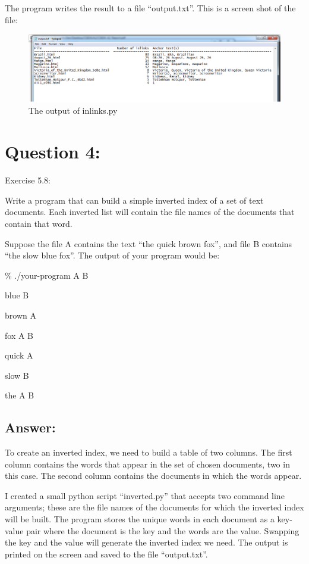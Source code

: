 \documentclass[a4paper, 11pt]{article}
\begin{document}
The program writes the result to a file ``output.txt''. This is a screen shot of the file:

\begin{figure}[h]
\caption{The output of inlinks.py}
\centering
\includegraphics[scale=0.45]{Q3/inlinks.png}
\end{figure}


\section*{Question 4:}
Exercise 5.8: 

Write a program that can build a simple inverted index of a set of text documents. Each inverted list will contain the file names of the documents that contain that word.

Suppose the file A contains the text “the quick brown fox”, and file B contains “the slow blue fox”. The output of your program would be:

\% ./your-program A B

blue B

brown A

fox A B

quick A

slow B

the A B

\subsection*{Answer:}

To create an inverted index, we need to build a table of two columns. The first column contains the words that appear in the set of chosen documents, two in this case. The second column contains the documents in which the words appear.

I created a small python script ``inverted.py'' that accepts two command line arguments; these are the file names of the documents for which the inverted index will be built. The program stores the unique words in each document as a key-value pair where the document is the key and the words are the value. Swapping the key and the value will generate the inverted index we need. The output is printed on the screen and saved to the file ``output.txt''.
\end{document}

